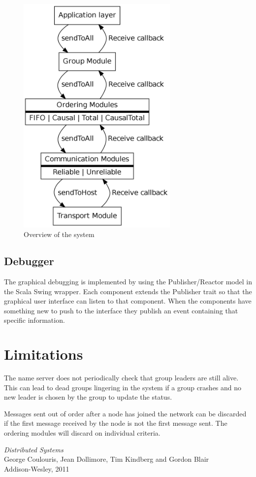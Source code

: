 \documentclass[10pt, oneside]{article}
\begin{document}
\begin{figure}[h]
\centering
\includegraphics[height=12cm]{graph2}
\caption{Overview of the system}
\label{fig:modules}
\end{figure}

\subsection{Debugger}

The graphical debugging is implemented by using the Publisher/Reactor model in
the Scala Swing wrapper. Each component extends the Publisher trait so that the
graphical user interface can listen to that component. When the components have
something new to push to the interface they publish an event containing that
specific information.

\section{Limitations}

The name server does not periodically check that group leaders are
still alive. This can lead to dead groups lingering in the system if a group
crashes and no new leader is chosen by the group to update the status.

Messages sent out of order after a node has joined the network can be discarded
if the first message received by the node is not the first message sent. The
ordering modules will discard on individual criteria.

\pagebreak

\begin{thebibliography}{9}

 \emph{Distributed Systems}\\
\newblock George Coulouris, Jean Dollimore, Tim Kindberg and Gordon Blair\\
\newblock Addison-Wesley, 2011\\

\end{thebibliography}
\end{document}
